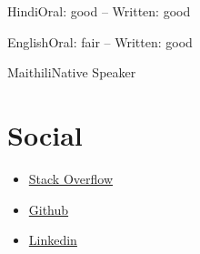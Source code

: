 \documentclass{tccv}
\begin{document}
\begin{factlist}
\item{Hindi}{Oral: good -- Written: good}
\item{English}{Oral: fair -- Written: good}
\item{Maithili}{Native Speaker}
\end{factlist}

\section{Social}
\begin{itemize}
\item \href{https://stackoverflow.com/users/4373992/gjha}{Stack Overflow}
\item \href{https://github.com/gautam0217}{Github}
\item \href{https://www.linkedin.com/in/gautam0217}{Linkedin}
\end{itemize}
\end{document}
